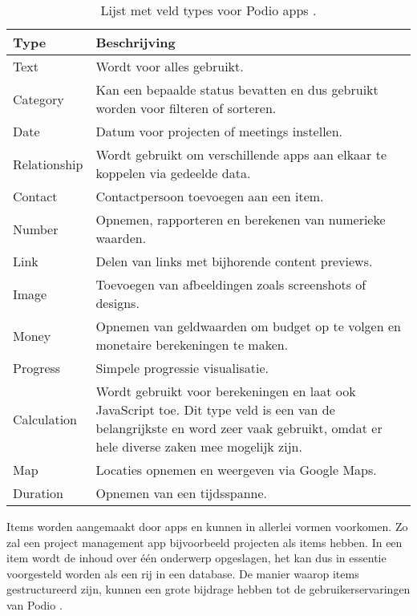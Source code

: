 \begin{table}[h]
    \centering
    \caption{\label{tab:podio_velden} Lijst met veld types voor Podio apps \autocite{PodioFeatures}.}
    \begin{tabular}{ | p{3cm} | p{11cm} | }
        \hline
        \textbf{Type} & \textbf{Beschrijving} \\
        \hline\hline
        Text & Wordt voor alles gebruikt. \\
        Category & Kan een bepaalde status bevatten en dus gebruikt worden voor filteren of sorteren. \\
        Date & Datum voor projecten of meetings instellen. \\
        Relationship & Wordt gebruikt om verschillende apps aan elkaar te koppelen via gedeelde data. \\
        Contact & Contactpersoon toevoegen aan een item. \\
        Number & Opnemen, rapporteren en berekenen van numerieke waarden. \\
        Link & Delen van links met bijhorende content previews. \\
        Image & Toevoegen van afbeeldingen zoals screenshots of designs. \\
        Money & Opnemen van geldwaarden om budget op te volgen en monetaire berekeningen te maken. \\
        Progress & Simpele progressie visualisatie. \\
        Calculation & Wordt gebruikt voor berekeningen en laat ook JavaScript toe. Dit type veld is een van de belangrijkste en word zeer vaak gebruikt, omdat er hele diverse zaken mee mogelijk zijn. \\
        Map & Locaties opnemen en weergeven via Google Maps. \\
        Duration & Opnemen van een tijdsspanne. \\
        \hline
\end{tabular}
\end{table}
    
Items worden aangemaakt door apps en kunnen in allerlei vormen voorkomen. Zo zal een project management app bijvoorbeeld projecten als items hebben. In een item wordt de inhoud over één onderwerp opgeslagen, het kan dus in essentie voorgesteld worden als een rij in een database. De manier waarop items gestructureerd zijn, kunnen een grote bijdrage hebben tot de gebruikerservaringen van Podio \autocite{TallyfyPodio}. \\

